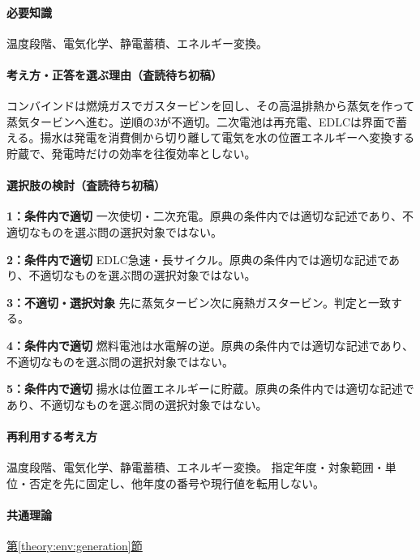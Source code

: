 \paragraph{必要知識} 温度段階、電気化学、静電蓄積、エネルギー変換。

\paragraph{考え方・正答を選ぶ理由（査読待ち初稿）} コンバインドは燃焼ガスでガスタービンを回し、その高温排熱から蒸気を作って蒸気タービンへ進む。逆順の3が不適切。二次電池は再充電、EDLCは界面で蓄える。揚水は発電を消費側から切り離して電気を水の位置エネルギーへ変換する貯蔵で、発電時だけの効率を往復効率としない。

\paragraph{選択肢の検討（査読待ち初稿）}\mbox{}\par

\noindent\textbf{1：条件内で適切} 一次使切・二次充電。原典の条件内では適切な記述であり、不適切なものを選ぶ問の選択対象ではない。\par

\noindent\textbf{2：条件内で適切} EDLC急速・長サイクル。原典の条件内では適切な記述であり、不適切なものを選ぶ問の選択対象ではない。\par

\noindent\textbf{3：不適切・選択対象} 先に蒸気タービン次に廃熱ガスタービン。判定と一致する。\par

\noindent\textbf{4：条件内で適切} 燃料電池は水電解の逆。原典の条件内では適切な記述であり、不適切なものを選ぶ問の選択対象ではない。\par

\noindent\textbf{5：条件内で適切} 揚水は位置エネルギーに貯蔵。原典の条件内では適切な記述であり、不適切なものを選ぶ問の選択対象ではない。\par

\paragraph{再利用する考え方} 温度段階、電気化学、静電蓄積、エネルギー変換。 指定年度・対象範囲・単位・否定を先に固定し、他年度の番号や現行値を転用しない。

\paragraph{共通理論} \hyperref[theory:env:generation]{第\ref*{theory:env:generation}節}

